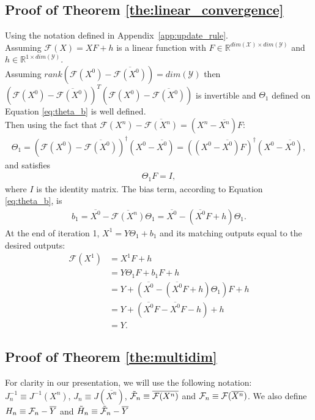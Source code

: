 \documentclass[nohyperref]{article}
\begin{document}
\subsection{Proof of Theorem \ref{the:linear_convergence}}
Using the notation defined in Appendix~\ref{app:update_rule}.\\ Assuming $\mathcal{F}(X)= X F+h$ is a linear function with $F\in\mathbb{R}^{dim(\mathcal{X})\times dim(\mathcal{Y})}$ and $h\in\mathbb{R}^{1 \times dim(\mathcal{Y})}$. \\
Assuming $rank(\mathcal{F}(X^0)-\overline{\mathcal{F}(X^0)})=dim(\mathcal{Y})$ then $(\mathcal{F}(X^0)-\overline{\mathcal{F}(X^0)})^T(\mathcal{F}(X^0)-\overline{\mathcal{F}(X^0)})$ is invertible and $\Theta_1$ defined on Equation \ref{eq:theta_b} is well defined. \\
Then using the fact that $\mathcal{F}(X^n)-\overline{\mathcal{F}(X^n)}=(X^n-\overline{X^n})F$:
\begin{align*}
    \Theta_1 = (\mathcal{F}(X^0)-\overline{\mathcal{F}(X^0)})^{\dagger}(X^0-\overline{X^0})=\left((X^0-\overline{X^0})F\right)^{\dagger}(X^0-\overline{X^0}),
\end{align*}
and satisfies
\begin{align*}
    \Theta_1 F = I,
\end{align*}
where $I$ is the identity matrix. The bias term, according to Equation \ref{eq:theta_b}, is 
\begin{align*}
    b_1=\overline{X^0}-\overline{\mathcal{F}(X^n)}\Theta_1=\overline{X^0}-(\overline{X^0}F+h)\Theta_1.
\end{align*}
At the end of iteration 1, $X^1=Y\Theta_1+b_1$ and its matching outputs equal to the desired outputs:
\begin{align*}
    \mathcal{F}(X^1) &=X^1 F + h\\
    &=Y\Theta_1 F + b_1 F + h\\
    &=Y + (\overline{X^0}-(\overline{X^0}F+h)\Theta_1) F + h\\
    &=Y + (\overline{X^0}F-\overline{X^0}F-h) + h\\
    &= Y.
\end{align*}




\subsection{Proof of Theorem \ref{the:multidim}}\label{app:multidim}

For clarity in our presentation, we will use the following notation: $J^{-1}_n\equiv J^{-1}(X^n)$, $J_n\equiv J(\overline{X^n})$, $\Tilde{\mathcal{F}}_n\equiv\overline{\mathcal{F}(X^n)}$ and $\mathcal{F}_n \equiv \mathcal{F}(\overline{X^n})$. We also define $H_n\equiv\mathcal{F}_n-\overline{Y}$ and $\Tilde{H}_n\equiv\Tilde{\mathcal{F}}_n-\overline{Y}$ 
 
\end{document}
